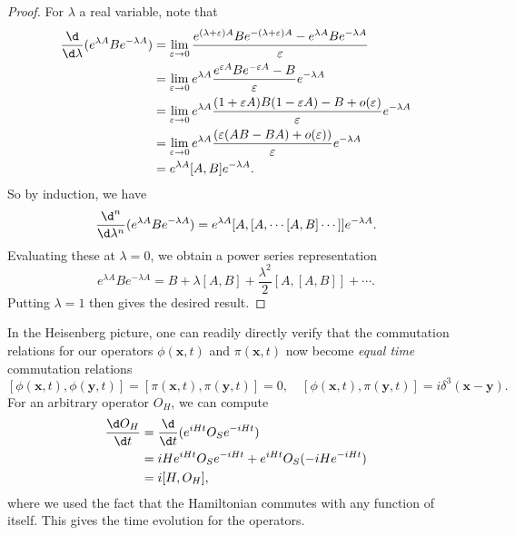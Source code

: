 \documentclass[a4paper]{article}
\begin{document}
\begin{proof}
  For $\lambda$ a real variable, note that
  \begin{align*}
    \frac{\d}{\d \lambda} (e^{\lambda A}B e^{-\lambda A}) &= \lim_{\varepsilon \to 0} \frac{e^{(\lambda + \varepsilon) A} B e^{-(\lambda + \varepsilon) A} - e^{\lambda A}Be^{-\lambda A}}{\varepsilon}\\
    &= \lim_{\varepsilon \to 0} e^{\lambda A}\frac{e^{\varepsilon A}B e^{-\varepsilon A}- B}{\varepsilon} e^{-\lambda A}\\
    &= \lim_{\varepsilon \to 0} e^{\lambda A}\frac{(1 + \varepsilon A)B(1 - \varepsilon A) - B + o(\varepsilon)}{\varepsilon} e^{-\lambda A}\\
    &= \lim_{\varepsilon \to 0} e^{\lambda A} \frac{(\varepsilon (AB - BA) + o(\varepsilon))}{\varepsilon}e^{-\lambda A}\\
    &= e^{\lambda A}[A, B] e^{-\lambda A}.
  \end{align*}
  So by induction, we have
  \[
    \frac{\d^n}{\d \lambda^n}(e^{\lambda A}B e^{-\lambda A}) = e^{\lambda A} [A, [A, \cdots[A, B]\cdots]]e^{-\lambda A}.
  \]
  Evaluating these at $\lambda = 0$, we obtain a power series representation
  \[
    e^{\lambda A}B e^{-\lambda A} = B + \lambda [A, B] + \frac{\lambda^2}{2}[A, [A, B]] + \cdots.
  \]
  Putting $\lambda = 1$ then gives the desired result.
\end{proof}
In the Heisenberg picture, one can readily directly verify that the commutation relations for our operators $\phi(\mathbf{x}, t)$ and $\pi(\mathbf{x}, t)$ now become \emph{equal time} commutation relations
\[
  [\phi(\mathbf{x}, t), \phi(\mathbf{y}, t)] = [\pi(\mathbf{x}, t), \pi(\mathbf{y}, t)] = 0,\quad [\phi(\mathbf{x}, t), \pi(\mathbf{y}, t)] = i \delta^3(\mathbf{x} - \mathbf{y}).
\]
For an arbitrary operator $O_H$, we can compute
\begin{align*}
  \frac{\d O_H}{\d t} &= \frac{\d}{\d t}(e^{iHt}O_S e^{-iHt})\\
  &= iH e^{iHt}O_Se^{-iHt} + e^{iHt}O_S (-iH e^{-iHt})\\
  &= i[H, O_H],
\end{align*}
where we used the fact that the Hamiltonian commutes with any function of itself. This gives the time evolution for the operators.
\end{document}
